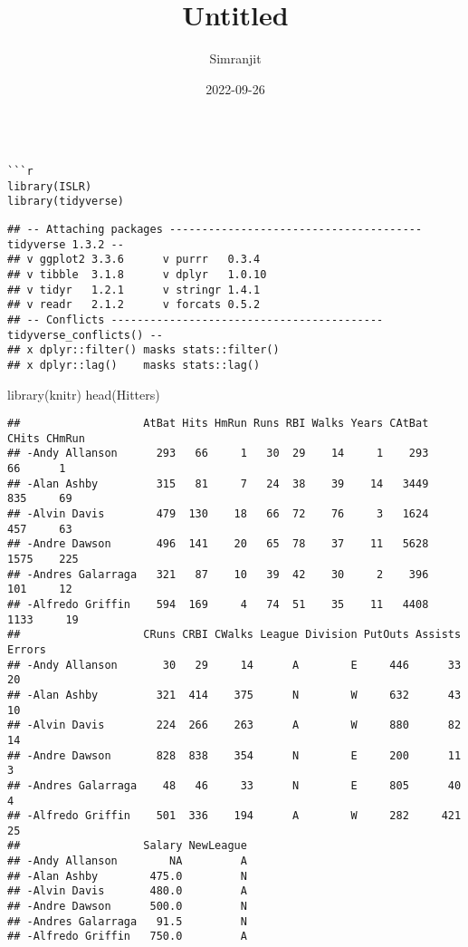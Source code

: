 \documentclass[
]{article}
\title{Untitled}
\author{Simranjit}
\date{2022-09-26}
\newenvironment{Shaded}{\begin{snugshade}}{\end{snugshade}}
\newcommand{\FunctionTok}[1]{\textcolor[rgb]{0.00,0.00,0.00}{#1}}
\newcommand{\NormalTok}[1]{#1}
\begin{document}
\maketitle

\begin{verbatim}

```r
library(ISLR)
library(tidyverse)
\end{verbatim}

\begin{verbatim}
## -- Attaching packages --------------------------------------- tidyverse 1.3.2 --
## v ggplot2 3.3.6      v purrr   0.3.4 
## v tibble  3.1.8      v dplyr   1.0.10
## v tidyr   1.2.1      v stringr 1.4.1 
## v readr   2.1.2      v forcats 0.5.2 
## -- Conflicts ------------------------------------------ tidyverse_conflicts() --
## x dplyr::filter() masks stats::filter()
## x dplyr::lag()    masks stats::lag()
\end{verbatim}

\begin{Shaded}
\begin{Highlighting}[]
\FunctionTok{library}\NormalTok{(knitr)}
\FunctionTok{head}\NormalTok{(Hitters)}
\end{Highlighting}
\end{Shaded}

\begin{verbatim}
##                   AtBat Hits HmRun Runs RBI Walks Years CAtBat CHits CHmRun
## -Andy Allanson      293   66     1   30  29    14     1    293    66      1
## -Alan Ashby         315   81     7   24  38    39    14   3449   835     69
## -Alvin Davis        479  130    18   66  72    76     3   1624   457     63
## -Andre Dawson       496  141    20   65  78    37    11   5628  1575    225
## -Andres Galarraga   321   87    10   39  42    30     2    396   101     12
## -Alfredo Griffin    594  169     4   74  51    35    11   4408  1133     19
##                   CRuns CRBI CWalks League Division PutOuts Assists Errors
## -Andy Allanson       30   29     14      A        E     446      33     20
## -Alan Ashby         321  414    375      N        W     632      43     10
## -Alvin Davis        224  266    263      A        W     880      82     14
## -Andre Dawson       828  838    354      N        E     200      11      3
## -Andres Galarraga    48   46     33      N        E     805      40      4
## -Alfredo Griffin    501  336    194      A        W     282     421     25
##                   Salary NewLeague
## -Andy Allanson        NA         A
## -Alan Ashby        475.0         N
## -Alvin Davis       480.0         A
## -Andre Dawson      500.0         N
## -Andres Galarraga   91.5         N
## -Alfredo Griffin   750.0         A
\end{verbatim}
\end{document}
